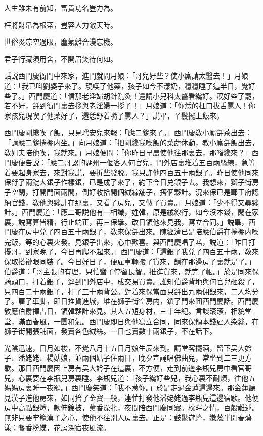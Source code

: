 人生雖未有前知，富貴功名豈力為。

枉將財帛為根蒂，豈容人力敵天時。

世俗炎凉空過眼，塵氛離合漫忘機。

君子行藏須用舍，不開眉笑待何如。

話説西門慶衙門中來家，進門就問月娘：「哥兒好些？使小廝請太醫去！」月娘道：「我已呌劉婆子來了。現喫了他薬，孩子如今不漾奶，穩穩睡了這半日，覺好些了。」西門慶道：「信那老淫婦胡針亂灸！還請小兒科太醫看纔好。旣好些了罷，若不好，㧱到衙門裏去拶與老淫婦一拶子！」月娘道：「你恁的枉口拔舌罵人！你家孩兒現喫了他薬好了，還恁舒着嘴子罵人？」説畢，丫鬟擺上飯來。

西門慶剛纔喫了飯，只見玳安兒來報：「應二爹來了。」西門慶敎小廝㧱茶出去：「請應二爹捲棚内坐。」向月娘道：「把剛纔我喫飯的菜蔬休動，教小廝㧱飯出去，敎姐夫陪他喫，我就來。」月娘便問：「你昨日早晨使他往那裏去，那喒纔來？」西門慶便告説：「應二哥認的湖州一個客人何官兒，門外店裏堆着五百兩絲線，急等着要起身家去，來對我説，要折些發脱。我只許他四百五十兩銀子。昨日使他同來保㧱了兩錠大銀子作樣銀，已是成了來了，約下今日兑銀子去。我想來，獅子街房子空閑，打開門面兩間，倒好收拾開個絨線舖子，搭個夥計。況來保已是鄆王府認納官錢，敎他與夥計在那裏，又看了房兒，又做了買賣。」月娘道：「少不得又尋夥計。」西門慶道：「應二哥説他有一相識，姓韓，原是絨線行，如今沒本錢，閑在家裏，説冩算皆精，行止端正，再三保擧。改日領他來見我，寫立合同。」説畢，西門慶在房中兑了四百五十兩銀子，敎來保㧱出來。陳經濟已是陪應伯爵在捲棚内喫完飯，等的心裏火發。見銀子出來，心中歡喜。與西門慶唱了喏，説道：「昨日打擾哥，到家晚了，今日再爬不起來。」西門慶道：「這銀子我兑了四百五十兩，敎來保取搭褳眼同裝了。今日好日子，便雇車輛搬了貨來，鎖在那邊房子裏就是了。」伯爵道：「哥主張的有理，只怕蠻子停留長智。推進貨來，就完了帳。」於是同來保騎頭口，打着銀子，逕到門外店中，成交易買賣。誰知伯爵背地與何官兒砸殺了，只四百二十兩銀子，打了三十兩背公。對着來保當面只㧱出九兩佣銀來，二人均分了。雇了車脚，即日推貨進城，堆在獅子街空房内，鎖了門來囬西門慶話。西門慶敎應伯爵擇吉日，領韓夥計來見。其人五短身材，三十年紀。言談滚滚，相貌堂堂，滿面春風，一團和氣。西門慶即日與他寫立合同，同來保領本錢雇人染絲，在獅子街開張舖面，發賣各色絨絲。一日也賣數十兩銀子，不在話下。

光陰迅速，日月如梭，不覺八月十五日月娘生辰來到。請堂客擺酒，留下吴大妗子、潘姥姥、楊姑娘，並兩個姑子住兩日，晚夕宣誦唱佛曲兒，常坐到二三更方歇。那日西門慶因上房有吴大妗子在這裏，不方便，走到前邊李瓶兒房中看官哥兒，心裏要在李瓶兒房裏睡。李瓶兒道：「孩子纔好些兒，我心裏不耐煩，往他五媽媽房裏睡一夜罷。」西門慶笑道：「我不惹你。」於是走過金蓮這邊來。那金蓮聽見漢子進他房來，如同拾了金寳一般，連忙打發他潘姥姥過李瓶兒這邊宿歇。他便房中高點銀燈，款伸錦被，薰香澡牝，夜間陪西門慶同寢。枕畔之情，百般難述。無非只要牢籠漢子之心，使他不往别人房裏去。正是：鼓鬣遊蜂，嫩蕊半開春蕩漾；餐香粉蝶，花房深宿夜風流。

